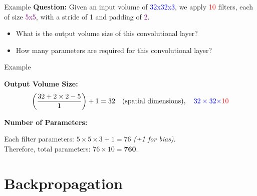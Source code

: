 \documentclass[default, aspectratio=169]{beamer}
\begin{document}
	\begin{frame}{Example}
		\textbf{Question:}
		Given an input volume of \textcolor{blue}{32x32x3}, we apply \textcolor{red}{10} filters, each of size \textcolor{purple}{5x5}, with a stride of \textcolor{deepgreen}{1} and padding of \textcolor{purple}{2}.\\[10pt]
		
		\begin{itemize}
			\item What is the output volume size of this convolutional layer?
			\item How many parameters are required for this convolutional layer?
		\end{itemize}
		
	\end{frame}
	
	\begin{frame}{Example}
		
		\textbf{Output Volume Size:}\\
		\[
		\left(\frac{32 + 2 \times 2 - 5}{1}\right) + 1 = 32 \quad \text{(spatial dimensions)}, \quad \textcolor{blue}{32 \times 32 \times} \textcolor{red}{10}
		\]
		
		\bigskip
		\textbf{Number of Parameters:}\\
		\bigskip
		
		Each filter parameters: \(5 \times 5 \times 3 + 1 = 76\) \hspace{15pt} \textit{(+1 for bias)}.\\
		Therefore, total parameters: \(76 \times 10 = \textbf{760}\).
		
	\end{frame}
	
	\section{Backpropagation}
	
\end{document}
